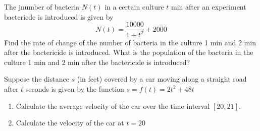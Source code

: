 \documentclass[12pt,letterpaper]{article}
\newenvironment{problem}[2][Problem]{\begin{trivlist}
\item[\hskip \labelsep {\bfseries #1}\hskip \labelsep {\bfseries #2.}]}{\end{trivlist}}
\begin{document}
\begin{problem}{5}
  The jnumber of bacteria $N(t)$ in a certain culture $t$ min after an experiment bactericde is introduced is given by
  $$
  N(t) = \frac{10000}{1+t^2} + 2000
  $$
  Find the rate of change of the number of bacteria in the culture 1 min and 2 min after the bactericide is introduced.  What is the population of the bacteria in the culture 1 min and 2 min after the bactericide is introduced?
\end{problem}

\begin{problem}{6}
  Suppose the distance $s$ (in feet) covered by a car moving along a straight road after $t$ seconds is given by the function $s = f(t) = 2t^2+48t$
  \begin{enumerate}[label=\roman*)]
  \item Calculate the average velocity of the car over the time interval $[20,21]$.
  \item Calculate the velocity of the car at $t = 20$
  \end{enumerate}
  
\end{problem}




\end{document}
